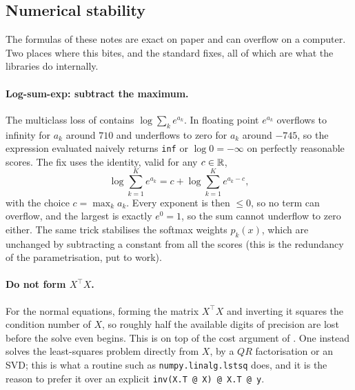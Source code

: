 \subsection{Numerical stability}
\label{subsec:numerics}

The formulas of these notes are exact on paper and can overflow on a computer. Two
places where this bites, and the standard fixes, all of which are what the libraries
do internally.

\paragraph{Log-sum-exp: subtract the maximum.}
The multiclass loss of  contains $\log \sum_{k} e^{a_k}$. In
floating point $e^{a_k}$ overflows to infinity for $a_k$ around $710$ and underflows to
zero for $a_k$ around $-745$, so the expression evaluated naively returns \texttt{inf}
or $\log 0 = -\infty$ on perfectly reasonable scores. The fix uses the identity, valid
for any $c \in \mathbb{R}$,
\[
\log \sum_{k=1}^K e^{a_k} = c + \log \sum_{k=1}^K e^{a_k - c} ,
\]
with the choice $c = \max_k a_k$. Every exponent is then $\leq 0$, so no term can
overflow, and the largest is exactly $e^0 = 1$, so the sum cannot underflow to zero
either. The same trick stabilises the softmax weights $p_k(x)$, which are unchanged by
subtracting a constant from all the scores (this is the redundancy of the
parametrisation, put to work).


\paragraph{Do not form $X^\top X$.}
For the normal equations, forming the matrix $X^\top X$ and inverting it squares the
condition number of $X$, so roughly half the available digits of precision are lost
before the solve even begins. This is on top of the cost argument of
. One instead solves the least-squares problem directly from $X$, by a
$QR$ factorisation or an SVD; this is what a routine such as
\texttt{numpy.linalg.lstsq} does, and it is the reason to prefer it over an explicit
\texttt{inv(X.T @ X) @ X.T @ y}.
